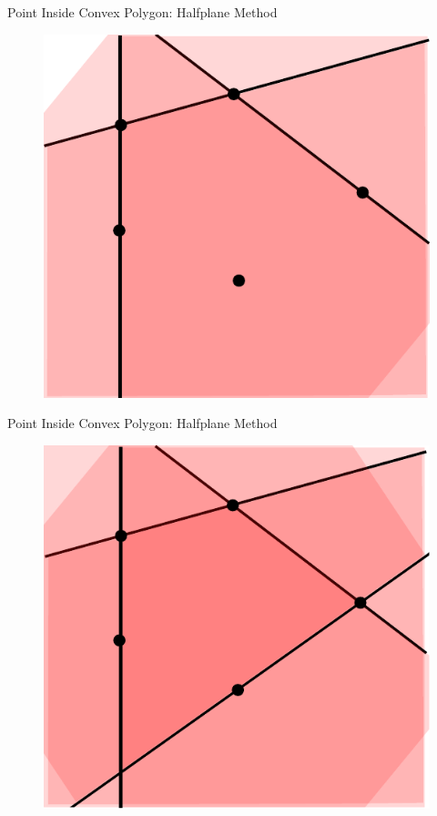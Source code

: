\documentclass{beamer}
\begin{document}
\begin{frame}{Point Inside Convex Polygon: Halfplane Method}

\begin{figure}[t]
	\centering
	\includegraphics[width=\textwidth]{Halfplane3.pdf}
\end{figure}

\end{frame}

\begin{frame}{Point Inside Convex Polygon: Halfplane Method}

\begin{figure}[t]
	\centering
	\includegraphics[width=\textwidth]{Halfplane4.pdf}
\end{figure}

\end{frame}
\end{document}

